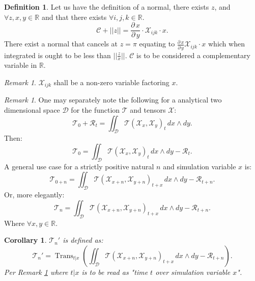 \documentclass[10pt]{article}
\theoremstyle{plain}
\newtheorem{corollary}[theorem]{Corollary}
\theoremstyle{definition}
\newtheorem{definition}[theorem]{Definition}
\theoremstyle{remark}
\newtheorem{remark}[theorem]{Remark}
\begin{document}
\begin{definition}
	Let us have the definition of a normal, there exists $z$, and $\forall z, x, y \in \mathbb{R}$ and that there exists $\forall i, j, k \in \mathbb{R}$.
	\begin{equation}
		\mathcal{C} + ||z|| = \frac{\partial \, x}{\partial \, y} \cdot \mathcal{X}_{ijk} \cdot x.
	\end{equation}
	There exist a normal that cancels at $z=\pi$ equating to $\frac{\partial \, x}{\partial \, y} \mathcal{X}_{ijk} \cdot x$ which when integrated is ought to be less than $||\frac{z}{x}||$. $\mathcal{C}$ is to be considered a complementary variable in $\mathbb{R}$.
\end{definition}

\begin{remark}
	$\mathcal{X}_{ijk}$ shall be a non-zero variable factoring $x$.
\end{remark}

\begin{remark}
\label{rem:math-special-case}
	One may separately note the following for a analytical two dimensional space $\mathcal{D}$ for the function $\mathcal{T}$ and tensors $\mathcal{X}$:
	\begin{equation}
		\mathcal{T}_0 + \mathcal{R}_{t} = \iint_{\mathcal{D}} \mathcal{T}(\mathcal{X}_{x}, \mathcal{X}_{y})_{t} \, dx \land dy.
	\end{equation}
	Then:
	\begin{equation}
		\mathcal{T}_0 = \iint_{\mathcal{D}} \mathcal{T}(\mathcal{X}_{x}, \mathcal{X}_{y})_{t} \, dx \land dy - \mathcal{R}_{t}.
	\end{equation}
	A general use case for a strictly positive natural $n$ and simulation variable $x$ is:
	\begin{equation}
		\mathcal{T}_{0+n} = \iint_{\mathcal{D}} \mathcal{T}(\mathcal{X}_{x+n}, \mathcal{X}_{y+n})_{t+x} \, dx \land dy - \mathcal{R}_{t+n}.
	\end{equation}
	Or, more elegantly:
	\begin{equation}
		\mathcal{T}_{n} = \iint_{\mathcal{D}} \mathcal{T}(\mathcal{X}_{x+n}, \mathcal{X}_{y+n})_{t+x} \, dx \land dy - \mathcal{R}_{t+n}.
	\end{equation}
	Where $\forall x, y \in \mathbb{R}$.
\end{remark}

\begin{corollary}
	$\mathcal{T}_{n}'$ is defined as:
	\begin{equation}
		\mathcal{T}_{n}' =\operatorname{Trans}_{t|x}(\iint_{\mathcal{D}} \mathcal{T}(\mathcal{X}_{x+n}, \mathcal{X}_{y+n})_{t+x} \, dx \land dy - \mathcal{R}_{t+n}).
	\end{equation}
	Per Remark \ref{rem:math-special-case} where $t|x$ is to be read as "time $t$ over simulation variable $x$".
\end{corollary}

\nocite{*}



\end{document}

